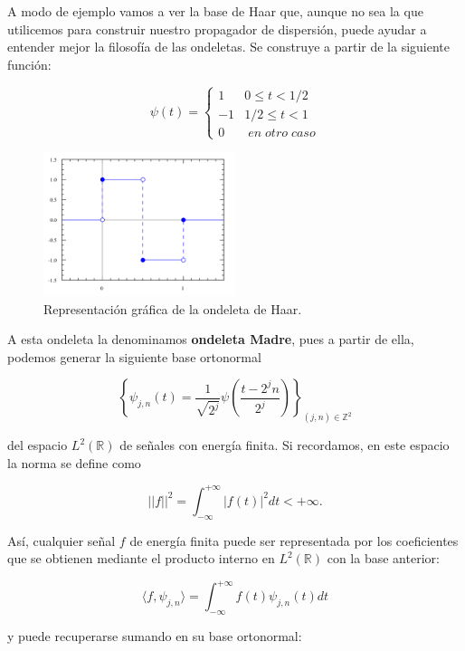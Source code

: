 \medskip

\noindent A modo de ejemplo vamos a ver la base de Haar que, aunque no sea la que utilicemos para construir nuestro propagador de dispersión, puede ayudar a entender mejor la filosofía de las ondeletas. Se construye a partir de la siguiente función: 

$$ \psi(t)= \begin{cases} 
      1 & 0\leq t < 1/2 \\
      -1 & 1/2\leq t < 1 \\
      0 & \; en \; otro \; caso
   \end{cases}$$

\begin{figure}[!h]
  \centering
  \includegraphics[width=0.5\textwidth]{img/Haar_wavelet.png}
  \caption{Representación gráfica de la ondeleta de Haar.}
  \label{fig:Ondeleta_de_Haar}
\end{figure}

\noindent A esta ondeleta la denominamos \textbf{ondeleta Madre}, pues a partir de ella, podemos generar la siguiente base ortonormal

\medskip

$$\left \lbrace \psi_{j,n}(t)= \frac{1}{\sqrt{2^j}} \psi\left(\frac{t-2^jn}{2^j}\right) \right\rbrace_{(j,n) \in \mathbb{Z}^2}$$

\noindent del espacio $L^2(\mathbb{R})$ de señales con energía finita. Si recordamos, en este espacio la norma se define como 

  $$||f||^2=\int_{-\infty}^{+\infty} |f(t)|^2 dt < +\infty.$$

\noindent Así, cualquier señal $f$ de energía finita puede ser representada por los coeficientes que se obtienen mediante el producto interno en $L^2(\mathbb{R})$ con la base anterior: 

$$\langle f,\psi_{j,n} \rangle =\int_{-\infty}^{+\infty} f(t) \psi_{j,n} (t) dt  $$

\noindent y puede recuperarse sumando en su base ortonormal:

